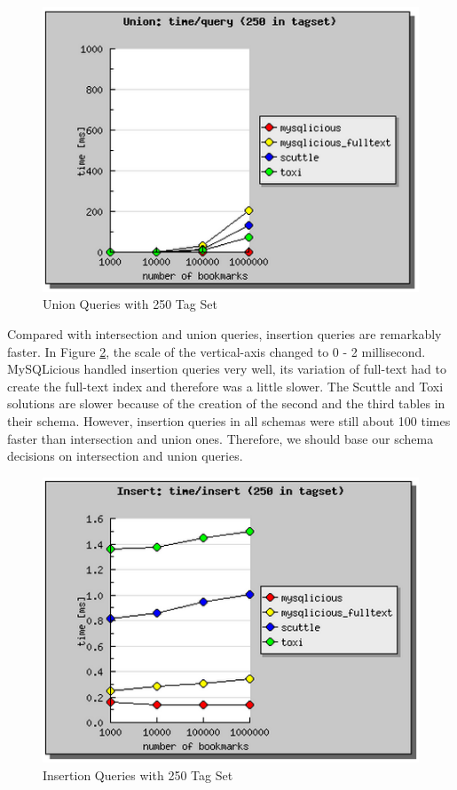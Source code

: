 \begin{figure}[!h]
\begin{centering}
\includegraphics[scale=0.8]{pics/union250}
\caption{Union Queries with 250 Tag Set}\label{fg:union250}
\end{centering}
\end{figure}

Compared with intersection and union queries, insertion queries are remarkably faster. In Figure \ref{fg:insert250}, the scale of the vertical-axis changed to 0 - 2 millisecond. MySQLicious handled insertion queries very well, its variation of full-text had to create the full-text index and therefore was a little slower. The Scuttle and Toxi solutions are slower because of the creation of the second and the third tables in their schema. However, insertion queries in all schemas were still about 100 times faster than intersection and union ones. Therefore, we should base our schema decisions on intersection and union queries. 

\begin{figure}[!h]
\begin{centering}
\includegraphics[scale=0.8]{pics/insert250}
\caption{Insertion Queries with 250 Tag Set}\label{fg:insert250}
\end{centering}
\end{figure}

